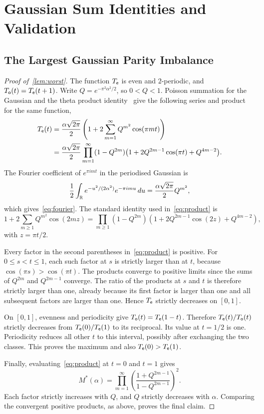 \section{Gaussian Sum Identities and Validation}
\label{app:analytic}

\subsection{The Largest Gaussian Parity Imbalance}

\begin{proof}[Proof of~\cref{lem:worst}]
The function $T_{\mathsf e}$ is even and $2$-periodic, and $T_{\mathsf o}(t)=T_{\mathsf e}(t+1)$. Write $Q=e^{-\pi^2\alpha^2/2}$, so $0<Q<1$. Poisson summation for the Gaussian and the theta product identity~\cite[Equation~20.5.3]{DLMF} give the following series and product for the same function,
\begin{align}
 T_{\mathsf e}(t)
 &=\frac{\alpha\sqrt{2\pi}}2\left(1+2\sum_{m=1}^{\infty}Q^{m^2}\cos(\pi mt)\right)\label{eq:fourier}\\
 &=\frac{\alpha\sqrt{2\pi}}2\prod_{m=1}^{\infty}(1-Q^{2m})
 \bigl(1+2Q^{2m-1}\cos(\pi t)+Q^{4m-2}\bigr).\label{eq:product}
\end{align}
The Fourier coefficient of $e^{\pi i mt}$ in the periodised Gaussian is
\[
 \frac12\int_{\mathbb{R}}e^{-u^2/(2\alpha^2)}e^{-\pi imu}\,du=\frac{\alpha\sqrt{2\pi}}2Q^{m^2},
\]
which gives~\cref{eq:fourier}. The standard identity used in~\cref{eq:product} is
\[
 1+2\sum_{m\ge1}Q^{m^2}\cos(2mz)
 =\prod_{m\ge1}(1-Q^{2m})(1+2Q^{2m-1}\cos(2z)+Q^{4m-2}),
\]
with $z=\pi t/2$.

Every factor in the second parentheses in~\cref{eq:product} is positive. For $0\le s<t\le1$, each such factor at $s$ is strictly larger than at $t$, because $\cos(\pi s)>\cos(\pi t)$. The products converge to positive limits since the sums of $Q^{2m}$ and $Q^{2m-1}$ converge. The ratio of the products at $s$ and $t$ is therefore strictly larger than one, already because its first factor is larger than one and all subsequent factors are larger than one. Hence $T_{\mathsf e}$ strictly decreases on $[0,1]$.

On $[0,1]$, evenness and periodicity give $T_{\mathsf o}(t)=T_{\mathsf e}(1-t)$. Therefore $T_{\mathsf e}(t)/T_{\mathsf o}(t)$ strictly decreases from $T_{\mathsf e}(0)/T_{\mathsf e}(1)$ to its reciprocal. Its value at $t=1/2$ is one. Periodicity reduces all other $t$ to this interval, possibly after exchanging the two classes. This proves the maximum and also $T_{\mathsf e}(0)>T_{\mathsf e}(1)$.

Finally, evaluating~\cref{eq:product} at $t=0$ and $t=1$ gives
\begin{equation}
\label{eq:rate-product}
 M^*(\alpha)=\prod_{m=1}^{\infty}\left(\frac{1+Q^{2m-1}}{1-Q^{2m-1}}\right)^2.
\end{equation}
Each factor strictly increases with $Q$, and $Q$ strictly decreases with $\alpha$. Comparing the convergent positive products, as above, proves the final claim.
\end{proof}

